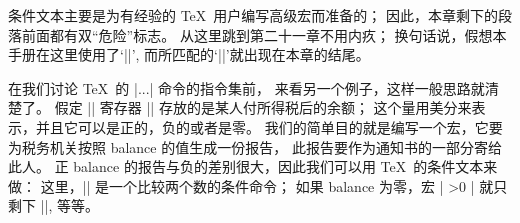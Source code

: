 {{{{{{{{%
\danger 条件文本主要是为有经验的 \TeX\ 用户编写高级宏而准备的；
因此，本章剩下的段落前面都有双``危险''标志。%
从这里跳到第二十一章不用内疚；
换句话说，假想本手册在这里使用了`|\ifexperienced|',
而所匹配的`|\fi|'就出现在本章的结尾。

\ddanger 在我们讨论 \TeX\ 的 |\if...| 命令的指令集前，
来看另一个例子，这样一般思路就清楚了。%
假定 |\count| 寄存器 |\balance| 存放的是某人付所得税后的余额；
这个量用美分来表示，并且它可以是正的，负的或者是零。%
\1我们的简单目的就是编写一个宏，它要为税务机关按照 balance 的值生成一份报告，
此报告要作为通知书的一部分寄给此人。%
正 balance 的报告与负的差别很大，因此我们可以用 \TeX\ 的条件文本来做：
\begintt
\def\statement{\ifnum\balance=0 \fullypaid
  \else\ifnum\balance>0 \overpaid
       \else\underpaid
       \fi
  \fi}
\endtt
这里，|\ifnum| 是一个比较两个数的条件命令；
如果 balance 为零，宏 |\statement| 就只剩下 |\fullypaid|, 等等。

}}}}}}}}
